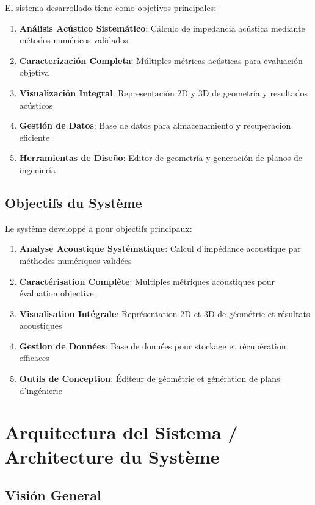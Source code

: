 \documentclass[12pt,a4paper,twocolumn]{article}
\begin{document}
El sistema desarrollado tiene como objetivos principales:

\begin{enumerate}
    \item \textbf{Análisis Acústico Sistemático}: Cálculo de impedancia acústica mediante métodos numéricos validados
    \item \textbf{Caracterización Completa}: Múltiples métricas acústicas para evaluación objetiva
    \item \textbf{Visualización Integral}: Representación 2D y 3D de geometría y resultados acústicos
    \item \textbf{Gestión de Datos}: Base de datos para almacenamiento y recuperación eficiente
    \item \textbf{Herramientas de Diseño}: Editor de geometría y generación de planos de ingeniería
\end{enumerate}

\subsection{Objectifs du Système}

Le système développé a pour objectifs principaux:

\begin{enumerate}
    \item \textbf{Analyse Acoustique Systématique}: Calcul d'impédance acoustique par méthodes numériques validées
    \item \textbf{Caractérisation Complète}: Multiples métriques acoustiques pour évaluation objective
    \item \textbf{Visualisation Intégrale}: Représentation 2D et 3D de géométrie et résultats acoustiques
    \item \textbf{Gestion de Données}: Base de données pour stockage et récupération efficaces
    \item \textbf{Outils de Conception}: Éditeur de géométrie et génération de plans d'ingénierie
\end{enumerate}

\section{Arquitectura del Sistema / Architecture du Système}

\subsection{Visión General}
\end{document}
